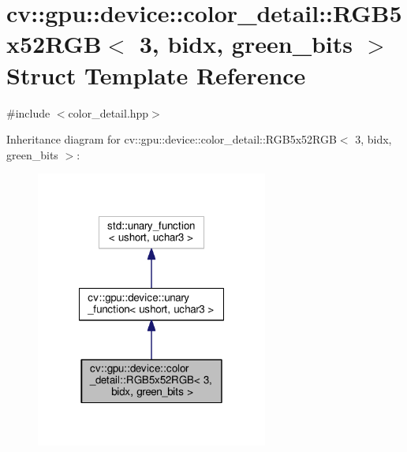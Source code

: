 \hypertarget{structcv_1_1gpu_1_1device_1_1color__detail_1_1RGB5x52RGB_3_013_00_01bidx_00_01green__bits_01_4}{\section{cv\-:\-:gpu\-:\-:device\-:\-:color\-\_\-detail\-:\-:R\-G\-B5x52\-R\-G\-B$<$ 3, bidx, green\-\_\-bits $>$ Struct Template Reference}
\label{structcv_1_1gpu_1_1device_1_1color__detail_1_1RGB5x52RGB_3_013_00_01bidx_00_01green__bits_01_4}
}


{\ttfamily \#include $<$color\-\_\-detail.\-hpp$>$}



Inheritance diagram for cv\-:\-:gpu\-:\-:device\-:\-:color\-\_\-detail\-:\-:R\-G\-B5x52\-R\-G\-B$<$ 3, bidx, green\-\_\-bits $>$\-:\nopagebreak
\begin{figure}[H]
\begin{center}
\leavevmode
\includegraphics[width=216pt]{structcv_1_1gpu_1_1device_1_1color__detail_1_1RGB5x52RGB_3_013_00_01bidx_00_01green__bits_01_4__inherit__graph}
\end{center}
\end{figure}


